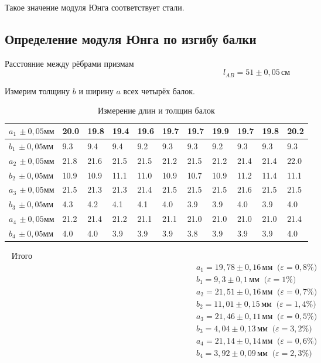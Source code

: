 Такое значение модуля Юнга соответствует стали.

\subsection{Определение модуля Юнга по изгибу балки}

Расстояние между рёбрами призмам
\[l_{AB}=51\pm 0{,}05\,\text{см}\]

Измерим толщину $b$ и ширину $a$ всех четырёх балок.

\begin{table}[!ht]
    \centering
    \caption{Измерение длин и толщин балок}
    \begin{tabular}{|l|l|l|l|l|l|l|l|l|l|l|}
    \hline
    $a_1\,\pm 0{,}05\text{мм}$ & 20.0 & 19.8 & 19.4 & 19.6 & 19.7 & 19.7 & 19.9 & 19.7 & 19.8 & 20.2 \\ \hline
    $b_1\,\pm 0{,}05\text{мм}$ & 9.3 & 9.4 & 9.4 & 9.2 & 9.3 & 9.3 & 9.2 & 9.3 & 9.3 & 9.3 \\ \hline
    $a_2\,\pm 0{,}05\text{мм}$ & 21.8 & 21.6 & 21.5 & 21.5 & 21.2 & 21.5 & 21.2 & 21.4 & 21.4 & 22.0 \\ \hline
    $b_2\,\pm 0{,}05\text{мм}$ & 10.9 & 10.9 & 11.1 & 11.0 & 10.9 & 10.7 & 10.9 & 11.2 & 11.4 & 11.1 \\ \hline
    $a_3\,\pm 0{,}05\text{мм}$ & 21.5 & 21.3 & 21.3 & 21.4 & 21.5 & 21.5 & 21.5 & 21.6 & 21.5 & 21.5 \\ \hline
    $b_3\,\pm 0{,}05\text{мм}$ & 4.3 & 4.2 & 4.1 & 4.1 & 4.0 & 3.9 & 3.9 & 4.0 & 3.9 & 4.0 \\ \hline
    $a_4\,\pm 0{,}05\text{мм}$ & 21.2 & 21.4 & 21.2 & 21.1 & 21.1 & 21.0 & 21.0 & 21.0 & 21.0 & 21.4 \\ \hline
    $b_4\,\pm 0{,}05\text{мм}$ & 4.0 & 4.0 & 3.9 & 3.9 & 3.9 & 3.8 & 3.9 & 3.9 & 3.9 & 4.0 \\ \hline
    \end{tabular}
\end{table}
\newpage
~
\newpage
Итого
\begin{gather*}
    a_1 = 19{,}78\pm 0{,}16\,\text{мм}\;\;\text{(}\varepsilon = 0{,}8\%\text{)}\\
    b_1 = 9{,}3\pm 0{,}1\,\text{мм}\;\;\text{(}\varepsilon = 1\%\text{)} \\
    a_2 = 21{,}51\pm 0{,}16\,\text{мм}\;\;\text{(}\varepsilon = 0{,}7\%\text{)} \\
    b_2 = 11{,}01\pm 0{,}15\,\text{мм}\;\;\text{(}\varepsilon = 1{,}4\%\text{)} \\
    a_3 = 21{,}46\pm 0{,}11\,\text{мм}\;\;\text{(}\varepsilon = 0{,}5\%\text{)} \\
    b_3 = 4{,}04\pm 0{,}13\,\text{мм}\;\;\text{(}\varepsilon = 3{,}2\%\text{)} \\
    a_4 = 21{,}14\pm 0{,}14\,\text{мм}\;\;\text{(}\varepsilon = 0{,}6\%\text{)} \\
    b_4 = 3{,}92\pm 0{,}09\,\text{мм}\;\;\text{(}\varepsilon = 2{,}3\%\text{)}
\end{gather*}

